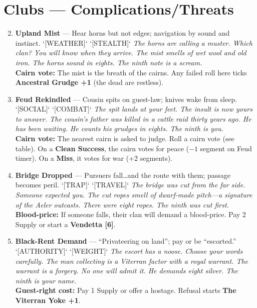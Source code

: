 \section{Clubs --- Complications/Threats}
\label{sec:ubral-complications}
\begin{enumerate}
\setcounter{enumi}{1}
\item \textbf{Upland Mist} --- Hear horns but not edges; navigation by sound and instinct. `[WEATHER]` `[STEALTH]`
  \hfill \textit{The horns are calling a muster. Which clan? You will know when they arrive. The mist smells of wet wool and old iron. The horns sound in eights. The ninth note is a scream.} \\
  \textbf{Cairn vote:} The mist is the breath of the cairns. Any failed roll here ticks \textbf{Ancestral Grudge +1} (the dead are restless).

\item \textbf{Feud Rekindled} --- Cousin spits on guest-law; knives wake from sleep. `[SOCIAL]` `[COMBAT]`
  \hfill \textit{The spit lands at your feet. The insult is now yours to answer. The cousin's father was killed in a cattle raid thirty years ago. He has been waiting. He counts his grudges in eights. The ninth is you.} \\
  \textbf{Cairn vote:} The nearest cairn is asked to judge. Roll a cairn vote (see table). On a \textbf{Clean Success}, the cairn votes for peace (\(-1\) segment on Feud timer). On a \textbf{Miss}, it votes for war (+2 segments).

\item \textbf{Bridge Dropped} --- Pursuers fall\dots and the route with them; passage becomes peril. `[TRAP]` `[TRAVEL]`
  \hfill \textit{The bridge was cut from the far side. Someone expected you. The cut ropes smell of dwarf-made pitch---a signature of the Aeler outcasts. There were eight ropes. The ninth was cut first.} \\
  \textbf{Blood-price:} If someone falls, their clan will demand a blood-price. Pay 2 Supply or start a \textbf{Vendetta [6]}.

\item \textbf{Black-Rent Demand} --- ``Privateering on land''; pay or be ``escorted.'' `[AUTHORITY]` `[WEIGHT]`
  \hfill \textit{The escort has a noose. Choose your words carefully. The man collecting is a Viterran factor with a royal warrant. The warrant is a forgery. No one will admit it. He demands eight silver. The ninth is your name.} \\
  \textbf{Guest-right cost:} Pay 1 Supply or offer a hostage. Refusal starts \textbf{The Viterran Yoke +1}.


\end{enumerate}
